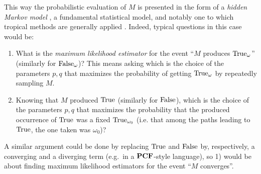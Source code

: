 
This way the probabilistic evaluation of $M$ is presented in the form of a \emph{hidden Markov model} \cite{Baum1966}, a fundamental statistical model, and notably one to which tropical methods are generally applied \cite{Pachter2004}. Indeed, typical questions in this case would be:
%
\begin{enumerate}
 \item What is the \emph{maximum likelihood estimator} for the event ``$M$ produces $\mathrm{True}_\omega$'' (similarly for $\mathrm{False}_\omega$)?
 This means asking which is the choice of the parameters $p,q$ that maximizes the probability of getting $\mathrm{True}_\omega$ by repeatedly sampling $M$.
 \item Knowing that $M$ produced $\mathrm{True}$ (similarly for $\mathrm{False}$), which is the choice of the parameters $p,q$ that maximizes the probability that the produced occurrence of $\mathrm{True}$ was a fixed $\mathrm{True}_{\omega_0}$ (i.e. that among the paths leading to $\mathrm{True}$, the one taken was $\omega_0$)?
\end{enumerate}
A similar argument could be done by replacing $\mathrm{True}$ and $\mathrm{False}$ by, respectively, a converging and a diverging term (e.g.~in a $\mathbf{PCF}$-style language), so 1) would be about finding maximum likelihood estimators for the event ``$M$ converges''.

